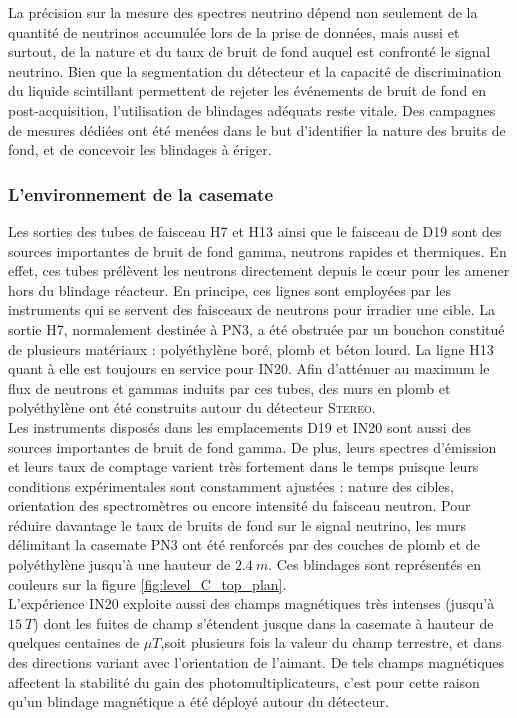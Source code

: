 La précision sur la mesure des spectres neutrino dépend non seulement de la quantité de neutrinos accumulée lors de la prise de données, mais aussi et surtout, de la nature et du taux de bruit de fond auquel est confronté le signal neutrino. Bien que la segmentation du détecteur et la capacité de discrimination du liquide scintillant permettent de rejeter les événements de bruit de fond en post-acquisition, l'utilisation de blindages adéquats reste vitale. Des campagnes de mesures dédiées ont été menées dans le but d'identifier la nature des bruits de fond, et de concevoir les blindages à ériger.\\ 

\subsubsection*{L'environnement de la casemate} 

Les sorties des tubes de faisceau H7 et H13 ainsi que le faisceau de D19 sont des sources importantes de bruit de fond gamma, neutrons rapides et thermiques. En effet, ces tubes prélèvent les neutrons directement depuis le c\oe ur pour les amener hors du blindage réacteur. En principe, ces lignes sont employées par les instruments qui se servent des faisceaux de neutrons pour irradier une cible. La sortie H7, normalement destinée à PN3, a été obstruée par un bouchon constitué de plusieurs matériaux : polyéthylène boré, plomb et béton lourd. La ligne H13 quant à elle est toujours en service pour IN20. Afin d'atténuer au maximum le flux de neutrons et gammas induits par ces tubes, des murs en plomb et polyéthylène ont été construits autour du détecteur \textsc{Stereo}.\\ 

Les instruments disposés dans les emplacements D19 et IN20 sont aussi des sources importantes de bruit de fond gamma. De plus, leurs spectres d'émission et leurs taux de comptage varient très fortement dans le temps puisque leurs conditions expérimentales sont constamment ajustées : nature des cibles, orientation des spectromètres ou encore intensité du faisceau neutron. Pour réduire davantage le taux de bruits de fond sur le signal neutrino, les murs délimitant la casemate PN3 ont été renforcés par des couches de plomb et de polyéthylène jusqu'à une hauteur de $\SI{2.4}{m}$. Ces blindages sont représentés en couleurs sur la figure \ref{fig:level_C_top_plan}.\\ 

L'expérience IN20 exploite aussi des champs magnétiques très intenses (jusqu'à $\SI{15}{T}$) dont les fuites de champ s'étendent jusque dans la casemate à hauteur de quelques centaines de $\mu T$,soit plusieurs fois la valeur du champ terrestre, et dans des directions variant avec l'orientation de l'aimant. De tels champs magnétiques affectent la stabilité du gain des photomultiplicateurs, c'est pour cette raison qu'un blindage magnétique a été déployé autour du détecteur.\\ 

